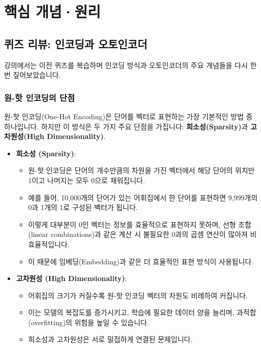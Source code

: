 \documentclass[11pt,a4paper]{article}
\theoremstyle{definition}
\newcommand{\newsection}[1]{\newpage\section{#1}}
\begin{document}
\newsection{핵심 개념·원리}

\subsection*{퀴즈 리뷰: 인코딩과 오토인코더}
강의에서는 이전 퀴즈를 복습하며 인코딩 방식과 오토인코더의 주요 개념들을 다시 한번 짚어보았습니다.

\subsubsection*{원-핫 인코딩의 단점}
\begin{infobox} %
원-핫 인코딩(One-Hot Encoding)은 단어를 벡터로 표현하는 가장 기본적인 방법 중 하나입니다.
하지만 이 방식은 두 가지 주요 단점을 가집니다: \textbf{희소성(Sparsity)}과 \textbf{고차원성(High Dimensionality)}.
\end{infobox}

\begin{itemize}
    \item \textbf{희소성 (Sparsity)}:
    \begin{itemize}
        \item 원-핫 인코딩은 단어의 개수만큼의 차원을 가진 벡터에서 해당 단어의 위치만 1이고 나머지는 모두 0으로 채워집니다.
        \item 예를 들어, 10,000개의 단어가 있는 어휘집에서 한 단어를 표현하면 9,999개의 0과 1개의 1로 구성된 벡터가 됩니다.
        \item 이렇게 대부분이 0인 벡터는 정보를 효율적으로 표현하지 못하며, 선형 조합(linear combinations)과 같은 계산 시 불필요한 0과의 곱셈 연산이 많아져 비효율적입니다.
        \item 이 때문에 임베딩(Embedding)과 같은 더 효율적인 표현 방식이 사용됩니다.
    \end{itemize}
    \item \textbf{고차원성 (High Dimensionality)}:
    \begin{itemize}
        \item 어휘집의 크기가 커질수록 원-핫 인코딩 벡터의 차원도 비례하여 커집니다.
        \item 이는 모델의 복잡도를 증가시키고, 학습에 필요한 데이터 양을 늘리며, 과적합(overfitting)의 위험을 높일 수 있습니다.
        \item 희소성과 고차원성은 서로 밀접하게 연결된 문제입니다.
    \end{itemize}
\end{itemize}
\end{document}
